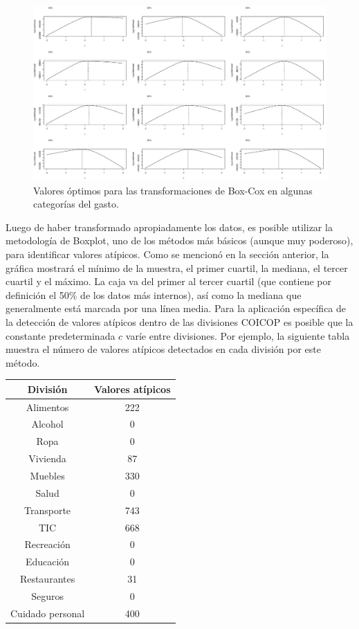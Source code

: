 \documentclass[
  12pt,
]{book}
\begin{document}
\begin{figure}
\includegraphics[width=0.5\linewidth]{Pics/ou1} \caption{Valores óptimos para las transformaciones de Box-Cox en algunas categorías del gasto.}\label{fig:figou1}
\end{figure}

Luego de haber transformado apropiadamente los datos, es posible utilizar la metodología de Boxplot, uno de los métodos más básicos (aunque muy poderoso), para identificar valores atípicos. Como se mencionó en la sección anterior, la gráfica mostrará el mínimo de la muestra, el primer cuartil, la mediana, el tercer cuartil y el máximo. La caja va del primer al tercer cuartil (que contiene por definición el 50\% de los datos más internos), así como la mediana que generalmente está marcada por una línea media. Para la aplicación específica de la detección de valores atípicos dentro de las divisiones COICOP es posible que la constante predeterminada \(c\) varíe entre divisiones. Por ejemplo, la siguiente tabla muestra el número de valores atípicos detectados en cada división por este método.

\begin{longtable}[]{@{}cc@{}}
\toprule()
División & Valores atípicos \\
\midrule()
\endhead
Alimentos & 222 \\
Alcohol & 0 \\
Ropa & 0 \\
Vivienda & 87 \\
Muebles & 330 \\
Salud & 0 \\
Transporte & 743 \\
TIC & 668 \\
Recreación & 0 \\
Educación & 0 \\
Restaurantes & 31 \\
Seguros & 0 \\
Cuidado personal & 400 \\
\bottomrule()
\end{longtable}
\end{document}
